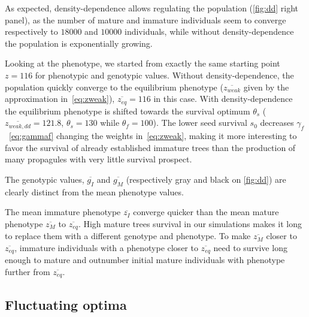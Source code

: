 As expected, density-dependence allows regulating the population (\autoref{fig:dd} right panel), as the number of mature and immature individuals seem to converge respectively to $18000$ and $10000$ individuals, while without density-dependence the population is exponentially growing.

Looking at the phenotype, we started from exactly the same starting point $z=116$ for phenotypic and genotypic values. Without density-dependence, the population quickly converge to the equilibrium phenotype ($\overline{z_{weak}}$ given by the approximation in~\autoref{eq:zweak}), $\overline{z_{eq}} = 116$ in this case. With density-dependence the equilibrium phenotype is shifted towards the survival optimum $\theta_s$ ($\overline{z_{weak, dd}} = 121.8$, $\theta_s = 130$ while $\theta_f = 100$). The lower seed survival $s_0$ decreases $\gamma_f$~\eqref{eq:gammaf} changing the weights in~\eqref{eq:zweak}, making it more interesting to favor the survival of already established immature trees than the production of many propagules with very little survival prospect.

The genotypic values, $\overline{g_I}$ and $\overline{g_M}$ (respectively gray and black on \autoref{fig:dd}) are clearly distinct from the mean phenotype values.

The mean immature phenotype $\overline{z_I}$ converge quicker than the mean mature phenotype $\overline{z_M}$ to $\overline{z_{eq}}$. High mature trees survival in our simulations makes it long to replace them with a different genotype and phenotype. To make $\overline{z_M}$ closer to $\overline{z_{eq}}$, immature individuals with a phenotype closer to $\overline{z_{eq}}$ need to survive long enough to mature and outnumber initial mature individuals with phenotype further from $\overline{z_{eq}}$.

\subsection*{Fluctuating optima}

